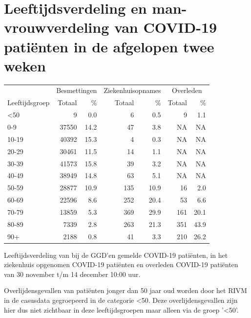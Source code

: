 \documentclass[
  english,
  man,floatsintext]{apa6}
\begin{document}
\hypertarget{leeftijdsverdeling-en-man-vrouwverdeling-van-covid-19-patiuxebnten-in-de-afgelopen-twee-weken}{%
\section{Leeftijdsverdeling en man-vrouwverdeling van COVID-19 patiënten in de afgelopen twee weken}\label{leeftijdsverdeling-en-man-vrouwverdeling-van-covid-19-patiuxebnten-in-de-afgelopen-twee-weken}}

\begin{table}
\centering\begingroup\fontsize{11}{13}\selectfont

\begin{threeparttable}
\begin{tabular}{lrrrrrr}
\toprule
\multicolumn{1}{c}{ } & \multicolumn{2}{c}{Besmettingen} & \multicolumn{2}{c}{Ziekenhuisopnames} & \multicolumn{2}{c}{Overleden} \\
\cmidrule(l{3pt}r{3pt}){2-3} \cmidrule(l{3pt}r{3pt}){4-5} \cmidrule(l{3pt}r{3pt}){6-7}
Leeftijdsgroep & Totaal & \% & Totaal & \% & Totaal & \%\\
\midrule
<50 & 9 & 0.0 & 6 & 0.5 & 9 & 1.1\\
0-9 & 37550 & 14.2 & 47 & 3.8 & NA & NA\\
10-19 & 40392 & 15.3 & 4 & 0.3 & NA & NA\\
20-29 & 30461 & 11.5 & 14 & 1.1 & NA & NA\\
30-39 & 41573 & 15.8 & 39 & 3.2 & NA & NA\\
40-49 & 38949 & 14.8 & 63 & 5.1 & NA & NA\\
50-59 & 28877 & 10.9 & 135 & 10.9 & 16 & 2.0\\
60-69 & 22596 & 8.6 & 252 & 20.4 & 53 & 6.6\\
70-79 & 13859 & 5.3 & 369 & 29.9 & 161 & 20.1\\
80-89 & 7339 & 2.8 & 263 & 21.3 & 351 & 43.9\\
90+ & 2188 & 0.8 & 41 & 3.3 & 210 & 26.2\\
\bottomrule
\end{tabular}
\begin{tablenotes}
\item[1] Leeftijdsverdeling van bij de GGD’en gemelde COVID-19 patiënten, in het ziekenhuis opgenomen COVID-19 patiënten en overleden COVID-19 patiënten van 30 november t/m 14 december 10:00 uur.
\item[2] Overlijdensgevallen van patiënten jonger dan 50 jaar oud worden door het RIVM in de casusdata gegroepeerd in de categorie <50. Deze overlijdensgevallen zijn hier dus niet zichtbaar in deze leeftijdsgroepen maar alleen via de groep '<50'.
\end{tablenotes}
\end{threeparttable}
\endgroup{}
\end{table}
\end{document}
